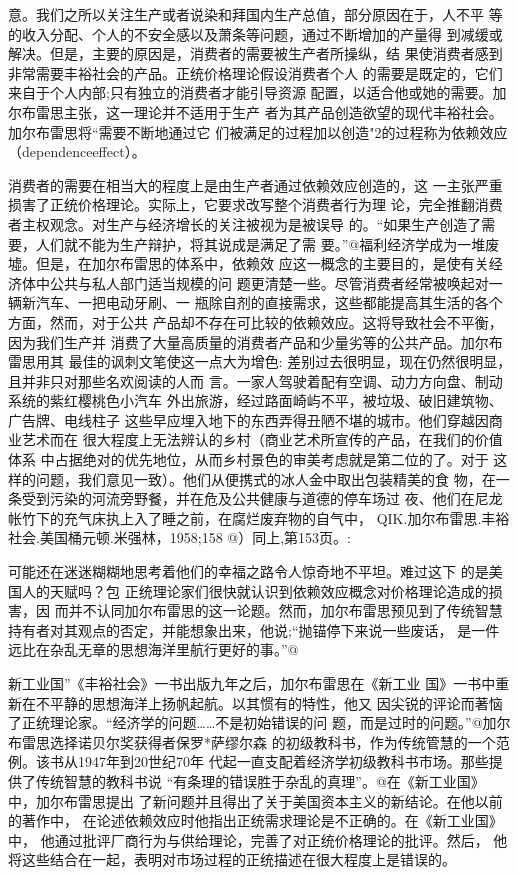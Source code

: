 意。我们之所以关注生产或者说染和拜国内生产总值，部分原因在于，人不平
等的收入分配、个人的不安全感以及萧条等问题，通过不断增加的产量得
到减缓或解决。但是，主要的原因是，消费者的需要被生产者所操纵，结
果使消费者感到非常需要丰裕社会的产品。正统价格理论假设消费者个人
的需要是既定的，它们来自于个人内部;只有独立的消费者才能引导资源
配置，以适合他或她的需要。加尔布雷思主张，这一理论并不适用于生产
者为其产品创造欲望的现代丰裕社会。加尔布雷思将“需要不断地通过它
们被满足的过程加以创造"2的过程称为依赖效应（dependenceeffect）。

消费者的需要在相当大的程度上是由生产者通过依赖效应创造的，这
一主张严重损害了正统价格理论。实际上，它要求改写整个消费者行为理
论，完全推翻消费者主权观念。对生产与经济增长的关注被视为是被误导
的。“如果生产创造了需要，人们就不能为生产辩护，将其说成是满足了需
要。”@福利经济学成为一堆废墟。但是，在加尔布雷思的体系中，依赖效
应这一概念的主要目的，是使有关经济体中公共与私人部门适当规模的问
题更清楚一些。尽管消费者经常被唤起对一辆新汽车、一把电动牙刷、一
瓶除自剂的直接需求，这些都能提高其生活的各个方面，然而，对于公共
产品却不存在可比较的依赖效应。这将导致社会不平衡，因为我们生产并
消费了大量高质量的消费者产品和少量劣等的公共产品。加尔布雷思用其
最佳的讽刺文笔使这一点大为增色:
差别过去很明显，现在仍然很明显，且并非只对那些名欢阅读的人而
言。一家人驾驶着配有空调、动力方向盘、制动系统的紫红樱桃色小汽车
外出旅游，经过路面崎屿不平，被垃圾、破旧建筑物、广告牌、电线柱子
这些早应埋入地下的东西弄得丑陋不堪的城市。他们穿越因商业艺术而在
很大程度上无法辨认的乡村（商业艺术所宣传的产品，在我们的价值体系
中占据绝对的优先地位，从而乡村景色的审美考虑就是第二位的了。对于
这样的问题，我们意见一致）。他们从便携式的冰人金中取出包装精美的食
物，在一条受到污染的河流旁野餐，并在危及公共健康与道德的停车场过
夜、他们在尼龙帐竹下的充气床执上入了睡之前，在腐烂废弃物的自气中，
QIK.加尔布雷思.丰裕社会.美国桶元顿.米强林，1958;158
@）同上,第153页。:

可能还在迷迷糊糊地思考着他们的幸福之路令人惊奇地不平坦。难过这下
的是美国人的天赋吗？包
正统理论家们很快就认识到依赖效应概念对价格理论造成的损害，因
而并不认同加尔布雷思的这一论题。然而，加尔布雷思预见到了传统智慧
持有者对其观点的否定，并能想象出来，他说;“抛锚停下来说一些废话，
是一件远比在杂乱无章的思想海洋里航行更好的事。”@

新工业国”《丰裕社会》一书出版九年之后，加尔布雷思在《新工业
国》一书中重新在不平静的思想海洋上扬帆起航。以其惯有的特性，他又
因尖锐的评论而著恼了正统理论家。“经济学的问题……不是初始错误的问
题，而是过时的问题。”@加尔布雷思选择诺贝尔奖获得者保罗*萨缪尔森
的初级教科书，作为传统管慧的一个范例。该书从1947年到20世纪70年
代起一直支配着经济学初级教科书市场。那些提供了传统智慧的教科书说
“有条理的错误胜于杂乱的真理”。@在《新工业国》中，加尔布雷思提出
了新问题并且得出了关于美国资本主义的新结论。在他以前的著作中，
在论述依赖效应时他指出正统需求理论是不正确的。在《新工业国》中，
他通过批评厂商行为与供给理论，完善了对正统价格理论的批评。然后，
他将这些结合在一起，表明对市场过程的正统描述在很大程度上是错误的。

